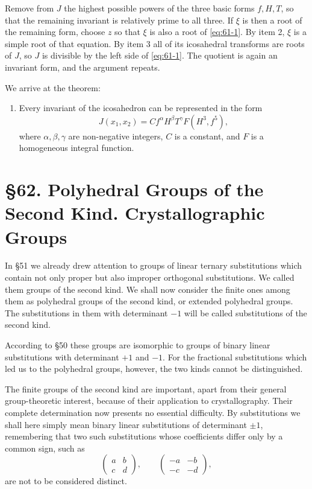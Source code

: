 \documentclass[11pt,a4paper]{book}
\newcommand{\webersection}[2]{\clearpage\section*{\S #1. #2}}
\begin{document}
Remove from \(J\) the highest possible powers of the three basic forms \(f,H,T\), so that the remaining invariant is relatively prime to all three.  If \(\xi\) is then a root of the remaining form, choose \(z\) so that \(\xi\) is also a root of \eqref{eq:61-1}.  By item 2, \(\xi\) is a simple root of that equation.  By item 3 all of its icosahedral transforms are roots of \(J\), so \(J\) is divisible by the left side of \eqref{eq:61-1}.  The quotient is again an invariant form, and the argument repeats.

We arrive at the theorem:

\begin{enumerate}[label=\arabic*.,resume]
\item Every invariant of the icosahedron can be represented in the form
\begin{equation}\label{eq:61-2}
 J(x_1,x_2)=C f^\alpha H^\beta T^\gamma F(H^3,f^5),
\end{equation}
where \(\alpha,\beta,\gamma\) are non-negative integers, \(C\) is a constant, and \(F\) is a homogeneous integral function.
\end{enumerate}

\webersection{62}{Polyhedral Groups of the Second Kind. Crystallographic Groups}

In \S 51 we already drew attention to groups of linear ternary substitutions which contain not only proper but also improper orthogonal substitutions.  We called them groups of the second kind.  We shall now consider the finite ones among them as polyhedral groups of the second kind, or extended polyhedral groups.  The substitutions in them with determinant \(-1\) will be called substitutions of the second kind.

According to \S 50 these groups are isomorphic to groups of binary linear substitutions with determinant \(+1\) and \(-1\).  For the fractional substitutions which led us to the polyhedral groups, however, the two kinds cannot be distinguished.

The finite groups of the second kind are important, apart from their general group-theoretic interest, because of their application to crystallography.  Their complete determination now presents no essential difficulty.  By substitutions we shall here simply mean binary linear substitutions of determinant \(\pm1\), remembering that two such substitutions whose coefficients differ only by a common sign, such as
\[
 \begin{pmatrix}a&b\\c&d\end{pmatrix},
 \qquad
 \begin{pmatrix}-a&-b\\-c&-d\end{pmatrix},
\]
are not to be considered distinct.
\end{document}
